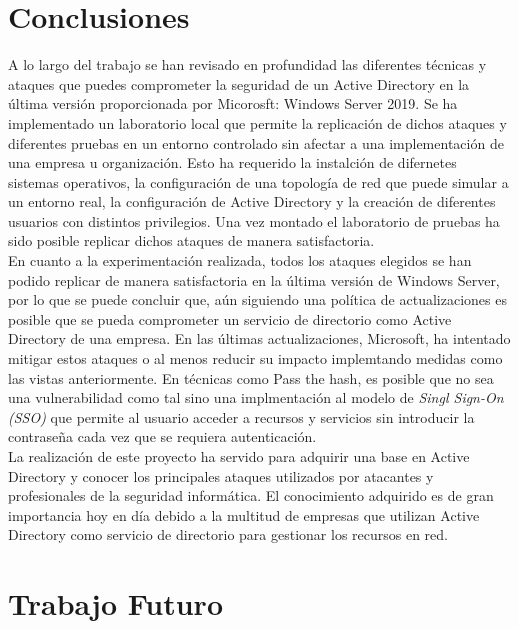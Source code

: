
\section{Conclusiones}

A lo largo del trabajo se han revisado en profundidad las diferentes técnicas y ataques que puedes comprometer la seguridad de un Active Directory en la última versión proporcionada por Micorosft: Windows Server 2019. Se ha implementado un laboratorio local que permite la replicación de dichos ataques y diferentes pruebas en un entorno controlado sin afectar a una implementación de una empresa u organización. Esto ha requerido la instalción de difernetes sistemas operativos, la configuración de una topología de red que puede simular a un entorno real, la configuración de Active Directory y la creación de diferentes usuarios con distintos privilegios. Una vez montado el laboratorio de pruebas ha sido posible replicar dichos ataques de manera satisfactoria. \\

En cuanto a la experimentación realizada, todos los ataques elegidos se han podido replicar de manera satisfactoria en la última versión de Windows Server, por lo que se puede concluir que, aún siguiendo una política de actualizaciones es posible que se pueda comprometer un servicio de directorio como Active Directory de una empresa. En las últimas actualizaciones, Microsoft, ha intentado mitigar estos ataques o al menos reducir su impacto implemtando medidas como las vistas anteriormente. En técnicas como Pass the hash, es posible que no sea una vulnerabilidad como tal sino una implmentación al modelo de {\it Singl Sign-On (SSO)} que permite al usuario acceder a recursos y servicios sin introducir la contraseña cada vez que se requiera autenticación. \\

La realización de este proyecto ha servido para adquirir una base en Active Directory y conocer los principales ataques utilizados por atacantes y profesionales de la seguridad informática. El conocimiento adquirido es de gran importancia hoy en día debido a la multitud de empresas que utilizan Active Directory como servicio de directorio para gestionar los recursos en red.\\

\section{Trabajo Futuro}

